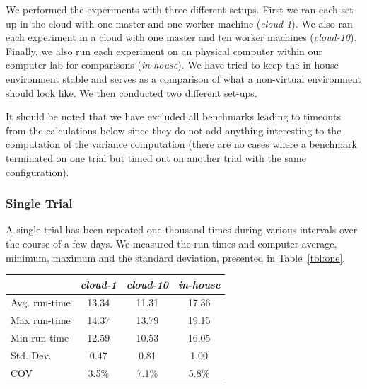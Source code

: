 \documentclass[a4paper]{IEEEtran}
\begin{document}
We performed the experiments with three different setups. First we ran
each set-up in the cloud with one master and one worker machine
(\emph{cloud-1}). We also ran each experiment in a cloud with one
master and ten worker machines (\emph{cloud-10}). Finally, we also run
each experiment on an physical computer within our computer lab for
comparisons (\emph{in-house}). We have tried to keep the in-house
environment stable and serves as a comparison of what a non-virtual
environment should look like. We then conducted two different set-ups.

It should be noted that we have excluded all benchmarks leading to
timeouts from the calculations below since they do not add anything
interesting to the computation of the variance computation (there are
no cases where a benchmark terminated on one trial but timed out on
another trial with the same configuration).

\subsubsection{Single Trial}
A single trial has been repeated one thousand times during various
intervals over the course of a few days. We measured the run-times and
computer average, minimum, maximum and the standard deviation,
presented in Table~\ref{tbl:one}.


\begin{Figure}
  \centering
  \begin{tabular}{|l|c|c|c|}
    \hline
    & \emph{cloud-1} & \emph{cloud-10} & \emph{in-house} \\
  \hline
  Avg. run-time &  13.34 & 11.31 & 17.36\\
  \hline
  Max run-time & 14.37 & 13.79 & 19.15 \\
  \hline
  Min run-time & 12.59 & 10.53 & 16.05\\
  \hline      
  Std. Dev. & 0.47 & 0.81 & 1.00 \\
  \hline
  COV & 3.5\% & 7.1\% & 5.8\% \\
  \hline  
\end{tabular}
\label{tbl:one}
\end{Figure}
\end{document}
